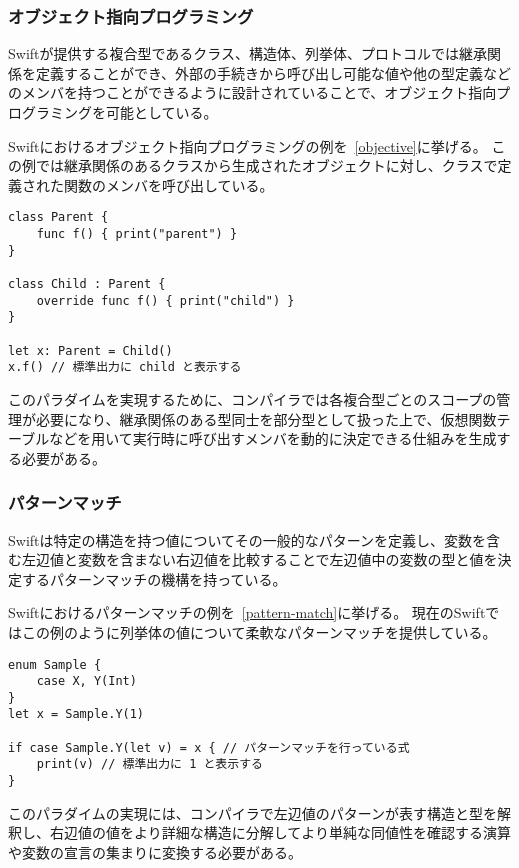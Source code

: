 \subsubsection{オブジェクト指向プログラミング}

Swiftが提供する複合型であるクラス、構造体、列挙体、プロトコルでは継承関係を定義することができ、外部の手続きから呼び出し可能な値や他の型定義などのメンバを持つことができるように設計されていることで、オブジェクト指向プログラミングを可能としている。

Swiftにおけるオブジェクト指向プログラミングの例を~\ref{objective}に挙げる。
この例では継承関係のあるクラスから生成されたオブジェクトに対し、クラスで定義された関数のメンバを呼び出している。

\begin{lstlisting}[caption=Swiftにおけるオブジェクト指向プログラミングの例, label=objective]
class Parent {
    func f() { print("parent") }
}

class Child : Parent {
    override func f() { print("child") }
}

let x: Parent = Child()
x.f() // 標準出力に child と表示する
\end{lstlisting}

このパラダイムを実現するために、コンパイラでは各複合型ごとのスコープの管理が必要になり、継承関係のある型同士を部分型として扱った上で、仮想関数テーブルなどを用いて実行時に呼び出すメンバを動的に決定できる仕組みを生成する必要がある。

\subsubsection{パターンマッチ}

Swiftは特定の構造を持つ値についてその一般的なパターンを定義し、変数を含む左辺値と変数を含まない右辺値を比較することで左辺値中の変数の型と値を決定するパターンマッチの機構を持っている。

Swiftにおけるパターンマッチの例を~\ref{pattern-match}に挙げる。
現在のSwiftではこの例のように列挙体の値について柔軟なパターンマッチを提供している。

\begin{lstlisting}[caption=Swiftにおけるパターンマッチの例, label=pattern-match]
enum Sample {
    case X, Y(Int)
}
let x = Sample.Y(1)

if case Sample.Y(let v) = x { // パターンマッチを行っている式
    print(v) // 標準出力に 1 と表示する
}
\end{lstlisting}

このパラダイムの実現には、コンパイラで左辺値のパターンが表す構造と型を解釈し、右辺値の値をより詳細な構造に分解してより単純な同値性を確認する演算や変数の宣言の集まりに変換する必要がある。


